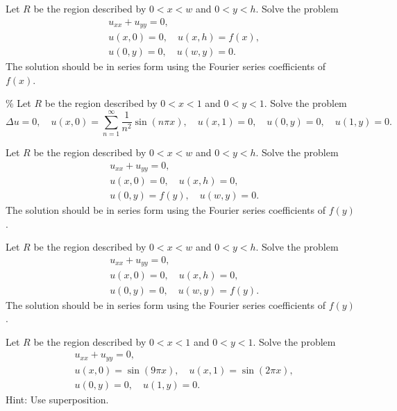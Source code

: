 \documentclass{ximera}
\begin{document}
\begin{exercise}
    Let $R$ be the region described by $0 < x < w$ and $0 < y < h$. Solve the problem
    \begin{align*}
        & u_{xx} + u_{yy} = 0, \\
        & u(x,0) = 0, \quad u(x,h) = f(x), \\
        & u(0,y) = 0, \quad u(w,y) = 0.
    \end{align*}
    The solution should be in series form using the Fourier series coefficients of $f(x)$.
\end{exercise}

\begin{exercise}\%
    Let $R$ be the region described by $0 < x < 1$ and $0 < y < 1$. Solve the problem
    \begin{equation*}
        \Delta u = 0, \quad u(x,0) = \sum_{n=1}^\infty \frac{1}{n^2} \sin (n \pi x), \quad u(x,1) = 0, \quad u(0,y) = 0, \quad u(1,y) = 0 .
    \end{equation*}
\end{exercise}

\begin{exercise}
    Let $R$ be the region described by $0 < x < w$ and $0 < y < h$. Solve the problem
    \begin{align*}
        & u_{xx} + u_{yy} = 0, \\
        & u(x,0) = 0, \quad u(x,h) = 0, \\
        & u(0,y) = f(y), \quad u(w,y) = 0.
    \end{align*}
    The solution should be in series form using the Fourier series coefficients of $f(y)$.
\end{exercise}

\begin{exercise}
    Let $R$ be the region described by $0 < x < w$ and $0 < y < h$. Solve the problem
    \begin{align*}
        & u_{xx} + u_{yy} = 0, \\
        & u(x,0) = 0, \quad u(x,h) = 0, \\
        & u(0,y) = 0, \quad u(w,y) = f(y).
    \end{align*}
    The solution should be in series form using the Fourier series coefficients of $f(y)$.
\end{exercise}

\begin{exercise}
    Let $R$ be the region described by $0 < x < 1$ and $0 < y < 1$. Solve the problem
    \begin{align*}
        & u_{xx} + u_{yy} = 0, \\
        & u(x,0) = \sin (9 \pi x), \quad u(x,1) = \sin (2 \pi x), \\
        & u(0,y) = 0, \quad u(1,y) = 0 .
    \end{align*}
    Hint: Use superposition.
\end{exercise}
\end{document}
